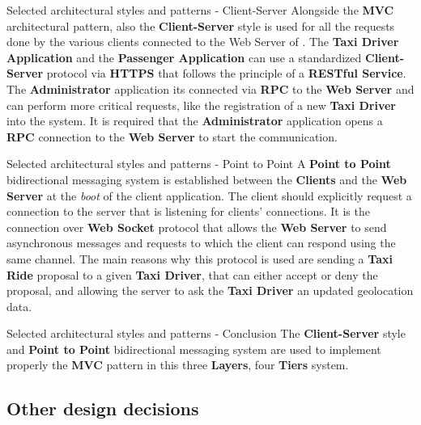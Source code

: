 \documentclass{../common/latex_classes/pdf_presentation}
\begin{document}
	\begin{frame}{Selected architectural styles and patterns - Client-Server}
		Alongside the \textbf{MVC} architectural pattern, also the \textbf{Client-Server} style is used for all the requests done by the various clients connected to the Web Server of \myTaxiService{}. The \textbf{Taxi Driver Application} and the \textbf{Passenger Application} can use a standardized \textbf{Client-Server} protocol via \textbf{HTTPS} that follows the principle of a \textbf{RESTful Service}. The \textbf{Administrator} application its connected via \textbf{RPC} to the \textbf{Web Server} and can perform more critical requests, like the registration of a new \textbf{Taxi Driver} into the system. It is required that the \textbf{Administrator} application opens a \textbf{RPC} connection to the \textbf{Web Server} to start the communication.
	\end{frame}
	
	\begin{frame}{Selected architectural styles and patterns - Point to Point}
		A \textbf{Point to Point} bidirectional messaging system is established between the \textbf{Clients} and the \textbf{Web Server} at the \textit{boot} of the client application. The client should explicitly request a connection to the server that is listening for clients' connections. It is the connection over \textbf{Web Socket} protocol that allows the \textbf{Web Server} to send asynchronous messages and requests to which the client can respond using the same channel. The main reasons why this protocol is used are sending a \textbf{Taxi Ride} proposal to a given \textbf{Taxi Driver}, that can either accept or deny the proposal, and allowing the server to ask the \textbf{Taxi Driver} an updated geolocation data.
	\end{frame}
	
	\begin{frame}{Selected architectural styles and patterns - Conclusion}
		The \textbf{Client-Server} style and \textbf{Point to Point} bidirectional messaging system are used to implement properly the \textbf{MVC} pattern in this three \textbf{Layers}, four \textbf{Tiers} system.
	\end{frame}
	
	\subsection{Other design decisions}
		
\end{document}
